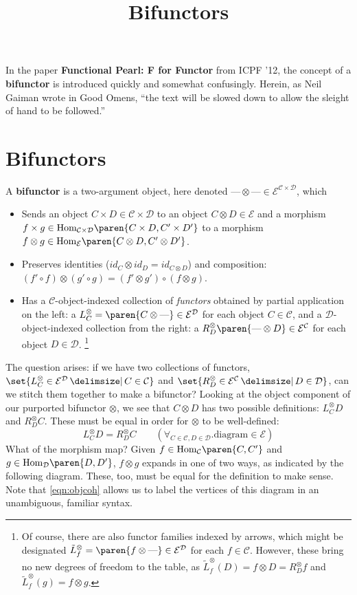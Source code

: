 \documentclass[letterpaper]{article}
\title{Bifunctors}
\DeclareMathOperator{\mmid}{\mathrel{}\mathclose{}\delimsize|\mathopen{}\mathrel{}}
\newcommand{\defn}[1]{{\bf #1}}
\newcommand{\Hom}[3]{\textrm{Hom}_{#1}{\paren{#2,#3}}}
\begin{document}
In the paper {\bf Functional Pearl: F for Functor} from ICPF '12, the
concept of a \defn{bifunctor} is introduced quickly and somewhat
confusingly.  Herein, as Neil Gaiman wrote in Good Omens,  ``the text will
be slowed down to allow the sleight of hand to be followed.''

\section{Bifunctors}

A \defn{bifunctor} is a two-argument object, here denoted $\textrm{---}
\otimes \textrm{---} \in \mathcal{E}^{\mathcal{C} \times \mathcal{D}}$,
which
%
\begin{itemize}
%
  \item Sends an object $C \times D \in \mathcal{C} \times \mathcal{D}$ to
  an object $C \otimes D \in \mathcal{E}$ and a morphism $f \times g \in
  \Hom{\mathcal{C} \times \mathcal{D}}{C \times D}{C' \times D'}$ to a
  morphism $f \otimes g \in \Hom{\mathcal{E}}{C \otimes D}{C' \otimes D'}$.
%
  \item Preserves identities ($id_C \otimes id_D = id_{C \otimes D}$) and
  composition: $(f' \circ f) \otimes (g' \circ g) = (f' \otimes g') \circ (f
  \otimes g)$.
%
  \item Has a $\mathcal{C}$-object-indexed collection of {\em functors}
  obtained by partial application on the left: a $L^\otimes_C = \paren{C
  \otimes \textrm{---}} \in \mathcal{E}^\mathcal{D}$ for each object $C \in
  \mathcal{C}$, and a $\mathcal{D}$-object-indexed collection from the
  right: a $R^\otimes_D \paren{\textrm{---} \otimes D} \in
  \mathcal{E}^\mathcal{C}$ for each object $D \in \mathcal{D}$.%
  \footnote{Of course, there are also functor families indexed by arrows,
  which might be designated $\tilde{L}^\otimes_f = \paren{f \otimes
  \textrm{---}} \in \mathcal{E}^\mathcal{D}$ for each $f \in \mathcal{C}$.
  However, these bring no new degrees of freedom to the table, as
  $\tilde{L}^\otimes_f(D) = f \otimes D = R^\otimes_D f$ and
  $\tilde{L}^\otimes_f(g) = f \otimes g$.}
%
\end{itemize}

The question arises: if we have two collections of functors, $\set{
L^\otimes_C \in \mathcal{E}^\mathcal{D} \mmid C \in \mathcal{C}}$ and $\set{
R^\otimes_D \in \mathcal{E}^\mathcal{C} \mmid D \in \mathcal{D}}$, can we
stitch them together to make a bifunctor?  Looking at the object component
of our purported bifunctor $\otimes$, we see that $C \otimes D$ has two
possible definitions: $L^\otimes_C D$ and $R^\otimes_D C$.  These must be
equal in order for $\otimes$ to be well-defined:
%
\begin{equation}\label{eqn:objcoh} L^\otimes_C D = R^\otimes_D C \qquad
(\forall_{C \in \mathcal{C},D \in \mathcal{D}} . \text{diagram} \in
\mathcal{E} ) \end{equation}
%
What of the morphism map?  Given $f \in \Hom{\mathcal{C}}{C}{C'}$ and $g \in
\Hom{\mathcal{D}}{D}{D'}$, $f \otimes g$ expands in one of two ways, as
indicated by the following diagram.  These, too, must be equal for the
definition to make sense.  Note that \autoref{eqn:objcoh} allows us to label
the vertices of this diagram in an unambiguous, familiar syntax.
\end{document}
